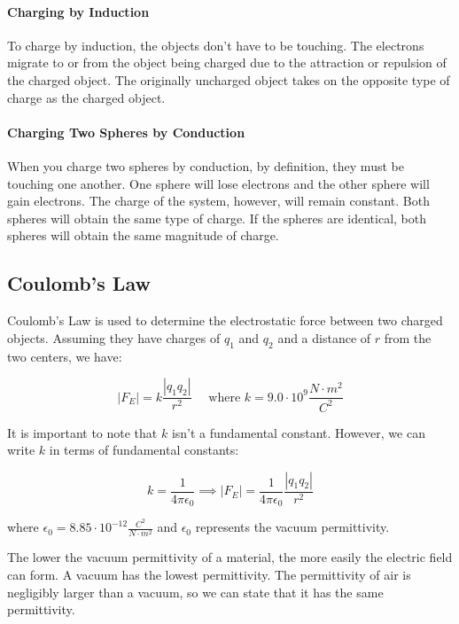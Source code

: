\documentclass{scrartcl}
\theoremstyle{definition}
\begin{document}
	\paragraph{Charging by Induction} To charge by induction, the objects don't have to be touching. The electrons migrate to or from the object being charged due to the attraction or repulsion of the charged object. The originally uncharged object takes on the opposite type of charge as the charged object.
	
	\paragraph{Charging Two Spheres by Conduction} When you charge two spheres by conduction, by definition, they must be touching one another. One sphere will lose electrons and the other sphere will gain electrons. The charge of the system, however, will remain constant. Both spheres will obtain the same type of charge. If the spheres are identical, both spheres will obtain the same magnitude of charge.
	
	\subsection{Coulomb's Law}
	
	\begin{theorem}
			Coulomb's Law is used to determine the electrostatic force between two charged objects. Assuming they have charges of $q_1$ and $q_2$ and a distance of $r$ from the two centers, we have:
			
			$$
			|F_E| = k\frac{|q_1 q_2|}{r^2} \quad \text{ where } k = 9.0 \cdot 10^9 \frac{N \cdot m^2}{C^2}
			$$
			
			\noindent It is important to note that $k$ isn't a fundamental constant. However, we can write $k$ in terms of fundamental constants:
			
			$$
			k = \frac{1}{4\pi \epsilon_0} \implies |F_E| = \frac{1}{4 \pi \epsilon_0} \frac{|q_1 q_2|}{r^2}
			$$
			
			\noindent where $\epsilon_0 = 8.85 \cdot 10^{-12} \frac{C^2}{N \cdot m^2}$ and $\epsilon_0$ represents the vacuum permittivity.
	\end{theorem}
	
	\noindent The lower the vacuum permittivity of a material, the more easily the electric field can form. A vacuum has the lowest permittivity. The permittivity of air is negligibly larger than a vacuum, so we can state that it has the same permittivity.
	
\end{document}
